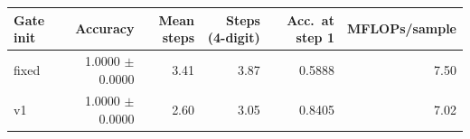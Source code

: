 \begin{tabular}{lrrrrr}
\toprule
Gate init & Accuracy & Mean steps & Steps (4-digit) & Acc.\ at step 1 & MFLOPs/sample \\
\midrule
fixed & 1.0000 $\pm$ 0.0000 & 3.41 & 3.87 & 0.5888 & 7.50 \\
v1 & 1.0000 $\pm$ 0.0000 & 2.60 & 3.05 & 0.8405 & 7.02 \\
\bottomrule
\end{tabular}